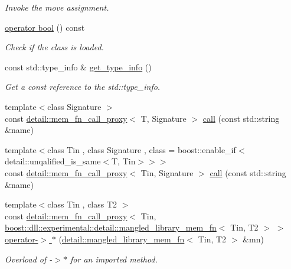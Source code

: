 \begin{DoxyCompactItemize}
\begin{DoxyCompactList}\small\item\em Invoke the move assignment. \end{DoxyCompactList}\item 
\mbox{\label{a01664_aa1c582893dd221ef1df729931d6aa2bf}} 
\hyperlink{a01664_aa1c582893dd221ef1df729931d6aa2bf}{operator bool} () const
\begin{DoxyCompactList}\small\item\em Check if the class is loaded. \end{DoxyCompactList}\item 
\mbox{\label{a01664_ab1922e488e5781cdc211d954202170f5}} 
const std\+::type\+\_\+info \& \hyperlink{a01664_ab1922e488e5781cdc211d954202170f5}{get\+\_\+type\+\_\+info} ()
\begin{DoxyCompactList}\small\item\em Get a const reference to the std\+::type\+\_\+info. \end{DoxyCompactList}\item 
{\footnotesize template$<$class Signature $>$ }\\const \hyperlink{a01652}{detail\+::mem\+\_\+fn\+\_\+call\+\_\+proxy}$<$ T, Signature $>$ \hyperlink{a01664_a69d3811c5d11899f42327de152536136}{call} (const std\+::string \&name)
\item 
{\footnotesize template$<$class Tin , class Signature , class  = boost\+::enable\+\_\+if$<$detail\+::unqalified\+\_\+is\+\_\+same$<$\+T, Tin$>$$>$$>$ }\\const \hyperlink{a01652}{detail\+::mem\+\_\+fn\+\_\+call\+\_\+proxy}$<$ Tin, Signature $>$ \hyperlink{a01664_a87e84e80e9ccb1fd92484cd0303b22b8}{call} (const std\+::string \&name)
\item 
\mbox{\label{a01664_ad1332e0b0b760d370962b8ae8bd65cce}} 
{\footnotesize template$<$class Tin , class T2 $>$ }\\const \hyperlink{a01652}{detail\+::mem\+\_\+fn\+\_\+call\+\_\+proxy}$<$ Tin, \hyperlink{a01672}{boost\+::dll\+::experimental\+::detail\+::mangled\+\_\+library\+\_\+mem\+\_\+fn}$<$ Tin, T2 $>$ $>$ \hyperlink{a01664_ad1332e0b0b760d370962b8ae8bd65cce}{operator-\/$>$ $\ast$} (\hyperlink{a01672}{detail\+::mangled\+\_\+library\+\_\+mem\+\_\+fn}$<$ Tin, T2 $>$ \&mn)
\begin{DoxyCompactList}\small\item\em Overload of -\/$>$$\ast$ for an imported method. \end{DoxyCompactList}\item 

\end{DoxyCompactItemize}
